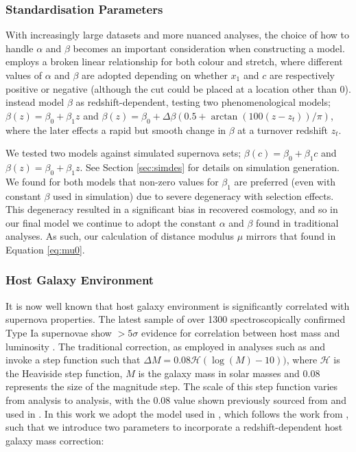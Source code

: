 \documentclass[a4paper,fleqn,usenatbib]{mnras}
\newcommand{\rubin}{\citetalias{Rubin2015}}
\begin{document}
\subsubsection{Standardisation Parameters}

With increasingly large datasets and more nuanced analyses, the choice of how to handle $\alpha$ and $\beta$ becomes an important consideration when constructing a model. {\rubin} employs a broken linear relationship for both colour and stretch, where different values of $\alpha$ and $\beta$ are adopted depending on whether $x_1$ and $c$ are respectively positive or negative (although the cut could be placed at a location other than 0). \citet{Shariff2016} instead model $\beta$ as redshift-dependent, testing two phenomenological models; $\beta(z) = \beta_0 + \beta_1 z$ and $\beta(z) = \beta_0 + \Delta \beta\left(0.5 + \arctan(100(z - z_t)) / \pi\right)$, where the later effects a rapid but smooth change in $\beta$ at a turnover redshift $z_t$.

We tested two models against simulated supernova sets; $\beta(c) = \beta_0 + \beta_1 c$ and $\beta(z) = \beta_0 + \beta_1 z$. See Section \ref{sec:simdes} for details on simulation generation. We found for both models that non-zero values for $\beta_1$ are preferred (even with constant $\beta$ used in simulation) due to severe degeneracy with selection effects. This degeneracy resulted in a significant bias in recovered cosmology, and so in our final model we continue to adopt the constant $\alpha$ and $\beta$ found in traditional analyses. As such, our calculation of distance modulus $\mu$ mirrors that found in Equation \eqref{eq:mu0}.

\subsubsection{Host Galaxy Environment}

It is now well known that host galaxy environment is significantly correlated with supernova properties. The latest sample of over 1300 spectroscopically confirmed Type Ia supernovae show $>5\sigma$ evidence for correlation between host mass and luminosity \citep{Uddin2017}. The traditional correction, as employed in analyses such as \citet{Suzuki2012} and \citet{Betoule2014} invoke a step function such that $\Delta M = 0.08 \mathcal{H}(\log(M) - 10))$, where $\mathcal{H}$ is the Heaviside step function, $M$ is the galaxy mass in solar masses and $0.08$ represents the size of the magnitude step. The scale of this step function varies from analysis to analysis, with the 0.08 value shown previously sourced from \cite{Sullivan2010} and used in \citet{Betoule2014}. In this work we adopt the model used in {\rubin}, which follows the work from \citet{Rigault2013}, such that we introduce two parameters to incorporate a redshift-dependent host galaxy mass correction:
\end{document}
